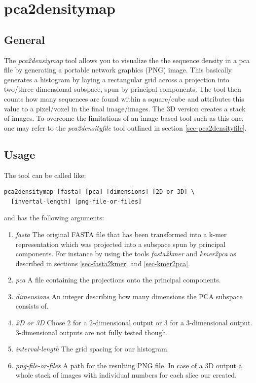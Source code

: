 \section{pca2densitymap} \label{sec-pca2densitymap}

\subsection{General}

The \emph{pca2densiymap} tool allows you to visualize the the sequence density
in a pca file by generating a portable network graphics (PNG)
image. This basically 
generates a histogram by laying a rectangular grid across a projection
into two/three dimensional subspace, spun by principal components. The
tool then counts how many sequences are found within a square/cube
and attributes this value to a pixel/voxel in the final
image/images. The 3D version creates a stack of images. To overcome
the limitations of an image based tool such as this one,
one may refer to the \emph{pca2densityfile} tool outlined in section
\ref{sec-pca2densityfile}. 

\subsection{Usage}

The tool can be called like:
\begin{lstlisting}
pca2densitymap [fasta] [pca] [dimensions] [2D or 3D] \
  [invertal-length] [png-file-or-files]
\end{lstlisting}
and has the following arguments:
\begin{enumerate}
  \item \emph{fasta} The original FASTA file that has been transformed
    into a k-mer representation which was projected into a subspace
    spun by principal components. For instance by using the tools
    \emph{fasta2kmer} and \emph{kmer2pca} as described in sections
    \ref{sec-fasta2kmer} and \ref{sec-kmer2pca}.
  \item \emph{pca} A file containing the projections onto the
    principal components.
  \item \emph{dimensions} An integer describing how many dimensions
    the PCA subspace consists of.
  \item \emph{2D or 3D} Chose 2 for a 2-dimensional output or 3 for a
    3-dimensional output. 3-dimensional outputs are not fully tested
    though.
  \item \emph{interval-length} The grid spacing for our histogram.
  \item \emph{png-file-or-files} A path for the resulting PNG file. In
    case of a 3D output a whole stack of images with individual
    numbers for each slice our created.  
\end{enumerate}

